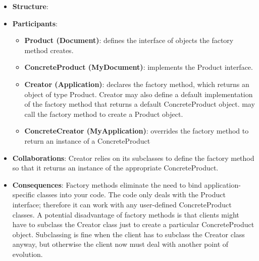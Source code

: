 \documentclass{report}
\begin{document}
\begin{itemize}
            \begin{itemize}
                \item a class can't anticipate the class of objects it must create.
                \item a class wants its subclasses to specify the objects it creates.
                \item classes delegate responsibility to one of several helper subclasses, and you want to localize the knowledge of which helper subclass is the delegate.
            \end{itemize}
        \item \textbf{Structure}: 
            \bigbreak \noindent 
        \item \textbf{Participants}: 
            \begin{itemize}
                \item \textbf{Product (Document)}: defines the interface of objects the factory method creates.
                \item \textbf{ConcreteProduct (MyDocument)}: implements the Product interface.
                \item \textbf{Creator (Application)}: declares the factory method, which returns an object of type Product. Creator may also define a default implementation of the factory method that returns a default ConcreteProduct object.
                    \bigbreak \noindent 
                    may call the factory method to create a Product object.
                \item \textbf{ConcreteCreator (MyApplication)}: overrides the factory method to return an instance of a ConcreteProduct
            \end{itemize}
        \item \textbf{Collaborations}: Creator relies on its subclasses to define the factory method so that it returns an instance of the appropriate ConcreteProduct.
        \item \textbf{Consequences}: Factory methods eliminate the need to bind application-specific classes into your code. The code only deals with the Product interface; therefore it can work with any user-defined ConcreteProduct classes.
            \bigbreak \noindent 
            A potential disadvantage of factory methods is that clients might have to subclass the Creator class just to create a particular ConcreteProduct object. Subclassing is fine when the client has to subclass the Creator class anyway, but otherwise the client now must deal with another point of evolution.

\end{itemize}
\end{document}
